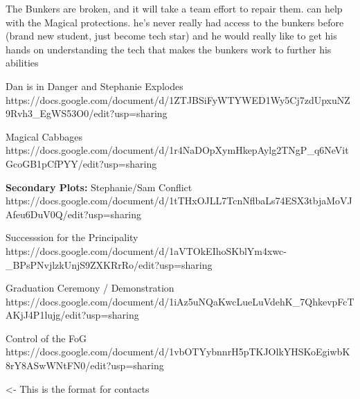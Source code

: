 \documentclass[char]{GL2020}
\begin{document}
The Bunkers are broken, and it will take a team effort to repair them.  \cTechStar{} can help with the Magical protections. he’s never really had access to the bunkers before (brand new student, just become tech star) and he would really like to get his hands on understanding the tech that makes the bunkers work to further his abilities


Dan is in Danger and Stephanie Explodes
https://docs.google.com/document/d/1ZTJBSiFyWTYWED1Wy5Cj7zdUpxuNZ9Rvh3_EgWS53O0/edit?usp=sharing

Magical Cabbages
https://docs.google.com/document/d/1r4NaDOpXymHkepAylg2TNgP_q6NeVitGcoGB1pCfPYY/edit?usp=sharing


\textbf{Secondary Plots:}
Stephanie/Sam Conflict
https://docs.google.com/document/d/1tTHxOJLL7TcnNflbaLs74ESX3tbjaMoVJAfeu6DuV0Q/edit?usp=sharing

Successsion for the Principality
https://docs.google.com/document/d/1aVTOkEIhoSKblYm4xwc-_BPsPNvjlzkUnjS9ZXKRrRo/edit?usp=sharing

Graduation Ceremony / Demonstration
https://docs.google.com/document/d/1iAz5uNQaKwcLueLuVdehK_7QhkevpFcTAKjJ4P1lujg/edit?usp=sharing

Control of the FoG
https://docs.google.com/document/d/1vbOTYybnnrH5pTKJOlkYHSKoEgiwbK8rY8ASwWNtFN0/edit?usp=sharing

\begin{itemz}[Goals]
	\item 
\end{itemz}

\begin{itemz}[Notes]
	\item 
\end{itemz}

\begin{contacts}
	\contact{\cTest{}} <- This is the format for contacts 
\end{contacts}
\end{document}
